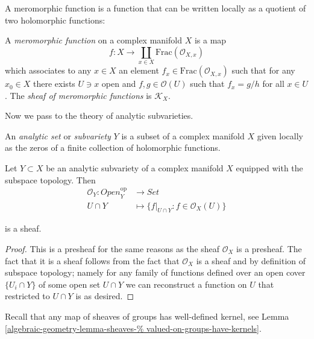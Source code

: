 \documentclass{book}
\begin{document}
\medskip\noindent
A meromorphic function is a function that
can be written locally as a quotient of two
holomorphic functions:

\begin{definition}
\label{definition-meromorphic-functions}
\begin{reference}
\cite[Definition 2.1.8]{huc}
\end{reference}
A {\it meromorphic function} on a complex
manifold $X$
is a map
$$
f:X \to \coprod_{x \in
X}\text{Frac}(\mathcal{O}_{X,x})
$$
which associates to any $x\in X$
an element $f_x \in
\text{Frac}(\mathcal{O}_{X,x})$
such that for any $x_0 \in X$
there exists $U\ni x$ open and $f,g
\in\mathcal{O}(U)$
such that $f_x=g/h$ for all $x \in U$.
The {\it sheaf of meromorphic functions} is
$\mathcal{K}_X$.
\end{definition}


\medskip\noindent
Now we pass to the theory of analytic
subvarieties.

\begin{definition}
\label{definition-analytic-subvariety}
An {\it analytic set} or {\it subvariety} $Y$
is a subset of a complex manifold $X$
given locally as the zeros of a finite
collection of holomorphic functions.
\end{definition}

\begin{lemma}
\label{lemma-structure-sheaf-of-subvariety}
Let $Y \subset X$ be an analytic subvariety
of a complex manifold $X$
equipped with the subspace topology.
Then
$$
\begin{aligned}
\mathcal{O}_Y: \mathit{Open}_Y^{\text{op}}
&\longrightarrow \mathit{Set} \\
U\cap Y &\longmapsto \{f|_{U \cap Y}:f \in
\mathcal{O}_X(U)\}
\end{aligned}
$$

\noindent
is a sheaf.
\end{lemma}

\begin{proof}
This is a presheaf for the same reasons as
the sheaf $\mathcal{O}_X$ is a presheaf.
The fact that it is a sheaf follows
from the fact that $\mathcal{O}_X$ is a
sheaf and by definition of subspace topology;
namely for any family of functions
defined over an open cover $\{U_i \cap Y\}$
of some open set  $U\cap Y$ we can
reconstruct a function
on $U$ that restricted to $U \cap Y$ is as
desired.
\end{proof}

Recall that any map of sheaves of groups
has well-defined kernel, see Lemma
\ref{algebraic-geometry-lemma-sheaves-%
valued-on-groups-have-kernels}.
\end{document}
